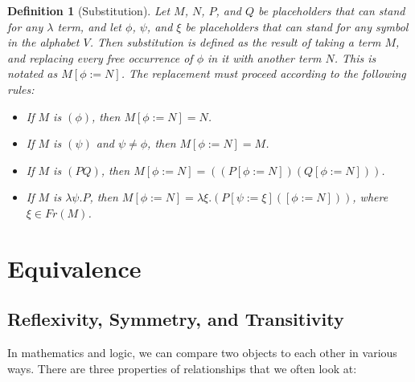 \documentclass{book}
\numberwithin{equation}{chapter}
\newtheorem{definition}{Definition}
\begin{document}
\begin{definition}[Substitution]
Let $M$, $N$, $P$, and $Q$ be placeholders that can stand for any $\lambda$ term, and let $\phi$, $\psi$, and $\xi$ be placeholders that can stand for any symbol in the alphabet $V$. Then substitution is defined as the result of taking a term $M$, and replacing every free occurrence of $\phi$ in it with another term $N$. This is notated as $M[\phi := N]$. The replacement must proceed according to the following rules:

\begin{itemize}
\item{If $M$ is $(\phi)$, then $M[\phi := N] = N$.}
\item{If $M$ is $(\psi)$ and $\psi \not = \phi$, then $M[\phi := N] = M$.}
\item{If $M$ is $(PQ)$, then $M[\phi := N] = ((P[\phi := N])(Q[\phi := N]))$.}
\item{If $M$ is $\lambda \psi.P$, then $M[\phi := N] = \lambda \xi.(P[\psi := \xi]([\phi := N]))$, where $\xi \in Fr(M)$.}
\end{itemize}
\end{definition}



\chapter{Equivalence}


\section{Reflexivity, Symmetry, and Transitivity}

In mathematics and logic, we can compare two objects to each other in various ways. There are three properties of relationships that we often look at:
\end{document}
